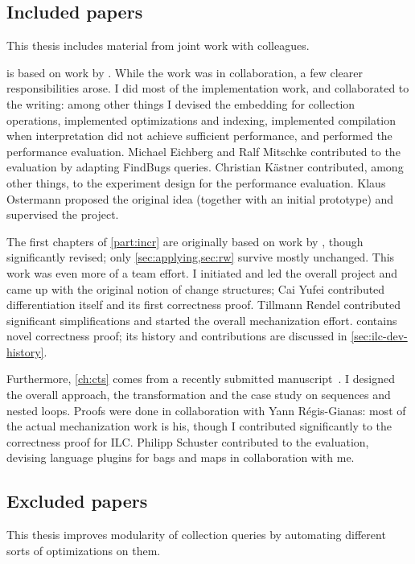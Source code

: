 \subsection{Included papers}
This thesis includes material from joint work with colleagues.

 is based on work by \citet*{GiarrussoAOSD13}. While the
work was in collaboration, a few clearer responsibilities arose.
I did most of the implementation work, and collaborated to the writing: among
other things I devised the embedding for collection operations, implemented
optimizations and indexing, implemented compilation when interpretation did not
achieve sufficient performance, and performed the performance evaluation.
Michael Eichberg and Ralf Mitschke contributed to the evaluation by adapting
FindBugs queries.
Christian K{\"{a}}stner contributed, among other things, to the experiment
design for the performance evaluation. Klaus Ostermann proposed the original
idea (together with an initial prototype) and supervised the project.

The first chapters of \cref{part:incr} are originally based on work by \citet*{CaiEtAl2014ILC}, though
significantly revised; only \cref{sec:applying,sec:rw} survive mostly unchanged.
This work was even more of a team effort. I initiated and led the
overall project and came up with the original notion of change structures; Cai
Yufei contributed differentiation itself and its first correctness proof.
Tillmann Rendel contributed significant simplifications and started the overall
mechanization effort.
 contains novel correctness proof; its history and
contributions are discussed in \cref{sec:ilc-dev-history}.

Furthermore, \cref{ch:cts} comes from a recently submitted
manuscript~\citep*{Giarrusso2018Static}. I
designed the overall approach, the transformation and the case study on
sequences and nested loops. Proofs were done in collaboration with Yann
Régis-Gianas: most of the actual mechanization work is his, though I contributed significantly to the
correctness proof for ILC. Philipp Schuster contributed to the evaluation,
devising language plugins for bags and maps in collaboration with me.


\subsection{Excluded papers}
This thesis improves modularity of collection queries by automating different sorts of
optimizations on them.

